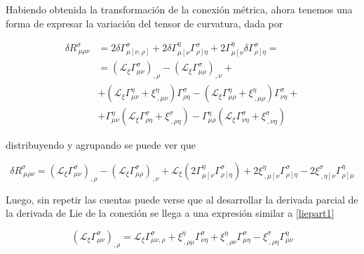 \documentclass{article}
\numberwithin{equation}{section}
\begin{document}
Habiendo obtenida la transformación de la conexión métrica, ahora tenemos una forma de expresar la variación del tensor de curvatura, dada por

\begin{equation*}
 \begin{aligned}
 \delta R^{\sigma}_{ \ \mu \rho \nu} &= 2\delta \Gamma^{\sigma}_{\mu\left[ \nu \right.,\left. \rho \right]} +   2\delta \Gamma^{\eta}_{\mu\left[ \nu \right.}\Gamma^{\sigma}_{ \left. \rho \right] \eta} + 2\Gamma^{\eta}_{\mu\left[ \nu \right.}\delta \Gamma^{\sigma}_{ \left. \rho \right] \eta}=\\
  &=\left( \mathcal{L}_{\xi} \Gamma^{\sigma}_{\mu \nu}\right)_{,\rho} - \left( \mathcal{L}_{\xi} \Gamma^{\sigma}_{\mu \rho}\right)_{,\nu} +\\
  &+\left( \mathcal{L}_{\xi} \Gamma^{\eta}_{\mu \nu}  + \xi^{\eta}_{ \ , \mu \nu} \right)\Gamma^{\sigma}_{\rho \eta} - \left( \mathcal{L}_{\xi} \Gamma^{\eta}_{\mu \rho}  + \xi^{\eta}_{ \ , \mu \rho} \right)\Gamma^{\sigma}_{\nu \eta} + \\
  &+ \Gamma^{\eta}_{\mu \nu} \left( \mathcal{L}_{\xi} \Gamma^{\sigma}_{\rho \eta}  + \xi^{\sigma}_{ \ , \rho \eta} \right) - \Gamma^{\eta}_{\mu \rho} \left( \mathcal{L}_{\xi} \Gamma^{\sigma}_{\nu \eta}  + \xi^{\sigma}_{ \ , \nu \eta} \right)
 \end{aligned}
\end{equation*}
 
distribuyendo y agrupando se puede ver que

\begin{equation}\label{varcurv}
 \delta R^{\sigma}_{ \ \mu \rho \nu} =  \left( \mathcal{L}_{\xi} \Gamma^{\sigma}_{\mu \nu}\right)_{,\rho} - \left( \mathcal{L}_{\xi} \Gamma^{\sigma}_{\mu \rho}\right)_{,\nu} + \mathcal{L}_{\xi} \left(2\Gamma^{\eta}_{\mu\left[ \nu \right.}\Gamma^{\sigma}_{ \left. \rho \right] \eta}\right) +
 2 \xi^{\eta}_{ \ , \mu \left[ \right. \nu}\Gamma^{\sigma}_{\left. \rho \right] \eta} - 2 \xi^{\sigma}_{ \ , \eta \left[ \right. \nu}\Gamma^{\eta}_{\left. \rho \right] \mu} 
\end{equation}

Luego, sin repetir las cuentas puede verse que al desarrollar la derivada parcial de la derivada de Lie de la conexión se llega a una expresión similar a \ref{liepart1}

\begin{equation*}
\left( \mathcal{L}_{\xi} \Gamma^{\sigma}_{\mu \nu}\right)_{,\rho} = \mathcal{L}_{\xi} \Gamma^{\sigma}_{\mu \nu , \rho} + \xi^{\eta}_{ \ , \rho  \mu}\Gamma^{\sigma}_{ \nu \eta} + \xi^{\eta}_{ \ , \rho  \nu}\Gamma^{\sigma}_{ \mu \eta} - \xi^{\sigma}_{ \ , \rho \eta} \Gamma^{\eta}_{ \mu  \nu}
\end{equation*}
\end{document}
